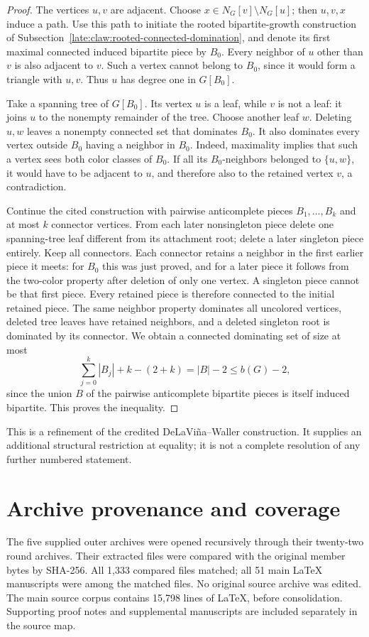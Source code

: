 \documentclass[11pt,a4paper]{article}
\theoremstyle{definition}\newtheorem{definition}[theorem]{Definition}
\theoremstyle{remark}\newtheorem{remark}[theorem]{Remark}
\begin{document}
\begin{proof}
The vertices $u,v$ are adjacent. Choose
$x\in N_G[v]\setminus N_G[u]$; then $u,v,x$ induce a path.
Use this path to initiate the rooted bipartite-growth construction
of Subsection~\ref{late:claw:rooted-connected-domination}, and denote
its first maximal connected induced bipartite piece by $B_0$.
Every neighbor of $u$ other than $v$ is also adjacent to $v$.
Such a vertex cannot belong to $B_0$, since it would form a triangle
with $u,v$. Thus $u$ has degree one in $G[B_0]$.

Take a spanning tree of $G[B_0]$. Its vertex $u$ is a leaf, while
$v$ is not a leaf: it joins $u$ to the nonempty remainder of the tree.
Choose another leaf $w$. Deleting $u,w$ leaves a nonempty connected
set that dominates $B_0$. It also dominates every vertex outside
$B_0$ having a neighbor in $B_0$. Indeed, maximality implies that
such a vertex sees both color classes of $B_0$. If all its
$B_0$-neighbors belonged to $\{u,w\}$, it would have to be adjacent
to $u$, and therefore also to the retained vertex $v$, a contradiction.

Continue the cited construction with pairwise anticomplete pieces
$B_1,\ldots,B_k$ and at most $k$ connector vertices. From each later
nonsingleton piece delete one spanning-tree leaf different from its
attachment root; delete a later singleton piece entirely. Keep all
connectors. Each connector retains a neighbor in the first earlier
piece it meets: for $B_0$ this was just proved, and for a later piece
it follows from the two-color property after deletion of only one
vertex. A singleton piece cannot be that first piece. Every retained
piece is therefore connected to the initial retained piece.
The same neighbor property dominates all uncolored vertices, deleted
tree leaves have retained neighbors, and a deleted singleton root is
dominated by its connector. We obtain a connected dominating set of
size at most
\[
 \sum_{j=0}^k |B_j|+k-(2+k)=|B|-2\le b(G)-2,
\]
since the union $B$ of the pairwise anticomplete bipartite pieces is
itself induced bipartite. This proves the inequality.
\end{proof}
This is a refinement of the credited DeLaVi\~na--Waller construction.
It supplies an additional structural restriction at equality; it is
not a complete resolution of any further numbered statement.



\appendix
\section{Archive provenance and coverage}
\label{app:provenance}
The five supplied outer archives were opened recursively through their
twenty-two round archives. Their extracted files were compared with the
original member bytes by SHA-256. All 1,333 compared files matched; all
51 main \LaTeX{} manuscripts were among the matched files. No original
source archive was edited. The main source corpus contains 15,798 lines
of \LaTeX{}, before consolidation. Supporting proof notes and supplemental
manuscripts are included separately in the source map.
\end{document}
